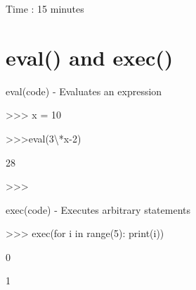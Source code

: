 \documentclass[
  letterpaper,
  DIV=11,
  numbers=noendperiod]{scrreprt}
\newenvironment{Shaded}{\begin{snugshade}}{\end{snugshade}}
\newcommand{\NormalTok}[1]{\textcolor[rgb]{0.00,0.23,0.31}{#1}}
\begin{document}
Time : 15 minutes


\chapter{eval() and exec()}\label{eval-and-exec}

eval(code) - Evaluates an expression

\begin{Shaded}
\begin{Highlighting}[]
\NormalTok{\textgreater{}\textgreater{}\textgreater{} x = 10 }
\end{Highlighting}
\end{Shaded}

\begin{Shaded}
\begin{Highlighting}[]
\NormalTok{\textgreater{}\textgreater{}\textgreater{}eval(\textquotesingle{}3\textbackslash{}*x{-}2\textquotesingle{}) }
\end{Highlighting}
\end{Shaded}

\begin{Shaded}
\begin{Highlighting}[]
\NormalTok{28 }
\end{Highlighting}
\end{Shaded}

\begin{Shaded}
\begin{Highlighting}[]
\NormalTok{\textgreater{}\textgreater{}\textgreater{} }
\end{Highlighting}
\end{Shaded}

exec(code) - Executes arbitrary statements

\begin{Shaded}
\begin{Highlighting}[]
\NormalTok{\textgreater{}\textgreater{}\textgreater{} exec(\textquotesingle{}for i in range(5): print(i)\textquotesingle{}) }
\end{Highlighting}
\end{Shaded}

\begin{Shaded}
\begin{Highlighting}[]
\NormalTok{0 }
\end{Highlighting}
\end{Shaded}

\begin{Shaded}
\begin{Highlighting}[]
\NormalTok{1 }
\end{Highlighting}
\end{Shaded}
\end{document}
